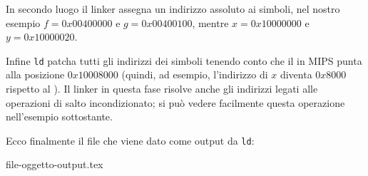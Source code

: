 In secondo luogo il linker assegna un indirizzo assoluto ai simboli, nel nostro esempio \(f=0x00400000\) e \(g=0x00400100\), mentre \(x=0x10000000\) e \(y=0x10000020\).

Infine \texttt{ld} patcha tutti gli indirizzi dei simboli tenendo conto che il  in MIPS punta alla posizione \(0x10008000\) (quindi, ad esempio, l'indirizzo di \(x\) diventa \(0x8000\) rispetto al ). Il linker in questa fase risolve anche gli indirizzi legati alle operazioni di salto incondizionato; si può vedere facilmente questa operazione nell'esempio sottostante.

Ecco finalmente il file che viene dato come output da \texttt{ld}:
\begin{table}[H]
	{file-oggetto-output.tex}
	\caption{File di output}
\end{table}


